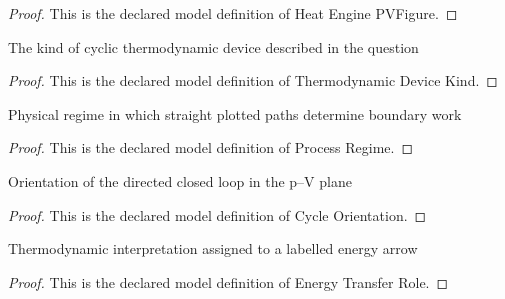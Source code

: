 \begin{proof}
  This is the declared model definition of Heat Engine PVFigure.
\end{proof}
\begin{definition}
  \label{def:physics:phyx-mini-0422:phyxminiproblems-problemphyxmini0422-thermodynamicdevicekind}
  The kind of cyclic thermodynamic device described in the question
\end{definition}
\begin{proof}
  This is the declared model definition of Thermodynamic Device Kind.
\end{proof}
\begin{definition}
  \label{def:physics:phyx-mini-0422:phyxminiproblems-problemphyxmini0422-processregime}
  Physical regime in which straight plotted paths determine boundary work
\end{definition}
\begin{proof}
  This is the declared model definition of Process Regime.
\end{proof}
\begin{definition}
  \label{def:physics:phyx-mini-0422:phyxminiproblems-problemphyxmini0422-cycleorientation}
  Orientation of the directed closed loop in the p--V plane
\end{definition}
\begin{proof}
  This is the declared model definition of Cycle Orientation.
\end{proof}
\begin{definition}
  \label{def:physics:phyx-mini-0422:phyxminiproblems-problemphyxmini0422-energytransferrole}
  Thermodynamic interpretation assigned to a labelled energy arrow
\end{definition}
\begin{proof}
  This is the declared model definition of Energy Transfer Role.
\end{proof}
